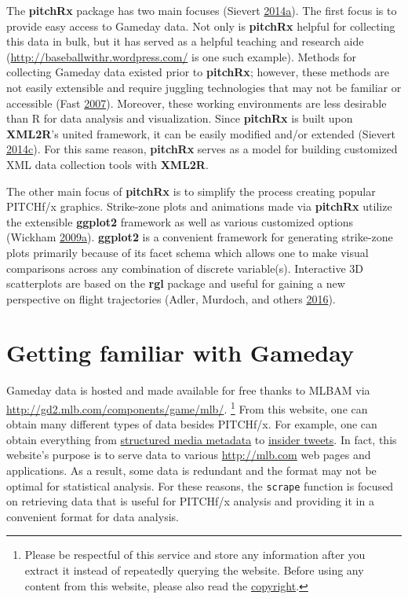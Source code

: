 \documentclass[12pt,]{isuthesis}
\let\rmarkdownfootnote\footnote%
\def\footnote{\protect\rmarkdownfootnote}
\begin{document}
The \textbf{pitchRx} package has two main focuses (Sievert
\protect\hyperlink{ref-pitchRx}{2014}\protect\hyperlink{ref-pitchRx}{a}).
The first focus is to provide easy access to Gameday data. Not only is
\textbf{pitchRx} helpful for collecting this data in bulk, but it has
served as a helpful teaching and research aide
(\url{http://baseballwithr.wordpress.com/} is one such example). Methods
for collecting Gameday data existed prior to \textbf{pitchRx}; however,
these methods are not easily extensible and require juggling
technologies that may not be familiar or accessible (Fast
\protect\hyperlink{ref-database}{2007}). Moreover, these working
environments are less desirable than R for data analysis and
visualization. Since \textbf{pitchRx} is built upon \textbf{XML2R}'s
united framework, it can be easily modified and/or extended (Sievert
\protect\hyperlink{ref-XML2R}{2014}\protect\hyperlink{ref-XML2R}{c}).
For this same reason, \textbf{pitchRx} serves as a model for building
customized XML data collection tools with \textbf{XML2R}.

The other main focus of \textbf{pitchRx} is to simplify the process
creating popular PITCHf/x graphics. Strike-zone plots and animations
made via \textbf{pitchRx} utilize the extensible \textbf{ggplot2}
framework as well as various customized options (Wickham
\protect\hyperlink{ref-ggplot2}{2009}\protect\hyperlink{ref-ggplot2}{a}).
\textbf{ggplot2} is a convenient framework for generating strike-zone
plots primarily because of its facet schema which allows one to make
visual comparisons across any combination of discrete variable(s).
Interactive 3D scatterplots are based on the \textbf{rgl} package and
useful for gaining a new perspective on flight trajectories (Adler,
Murdoch, and others \protect\hyperlink{ref-rgl}{2016}).

\section{Getting familiar with
Gameday}\label{getting-familiar-with-gameday}

Gameday data is hosted and made available for free thanks to MLBAM via
\url{http://gd2.mlb.com/components/game/mlb/}.
\footnote{Please be respectful of this service and store any information after
you extract it instead of repeatedly querying the website. Before
using any content from this website, please also read the \href{http://gdx.mlb.com/components/copyright.txt}{copyright}.
} From this website, one can obtain many different types of data besides
PITCHf/x. For example, one can obtain everything from
\href{http://gd2.mlb.com/components/game/mlb/year_2013/month_07/day_16/gid_2013_07_16_aasmlb_nasmlb_1/media/instadium.xml}{structured media metadata}
to
\href{http://gd2.mlb.com/components/game/mlb/twitter/anaInsiderTweets.xml}{insider tweets}.
In fact, this website's purpose is to serve data to various
\url{http://mlb.com} web pages and applications. As a result, some data
is redundant and the format may not be optimal for statistical analysis.
For these reasons, the \texttt{scrape} function is focused on retrieving
data that is useful for PITCHf/x analysis and providing it in a
convenient format for data analysis.
\end{document}
